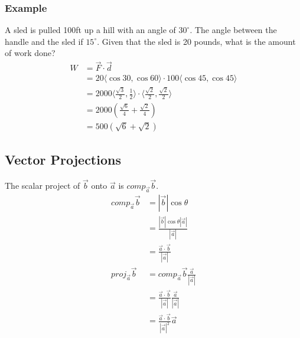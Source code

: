 \documentclass{math}
\begin{document}
\subsubsection*{Example}
A sled is pulled 100ft up a hill with an angle of \( 30^{\circ} \). The angle
between the handle and the sled if \( 15^{\circ} \). Given that the sled is 20
pounds, what is the amount of work done?
\begin{align*}
  W &= \vec{F}\cdot\vec{d} \\
  &= 20\langle\cos30,\cos60\rangle\cdot100\langle\cos45,\cos45\rangle \\
  &= 2000\langle\frac{\sqrt{3}}{2},\frac{1}{2}\rangle
    \cdot\langle\frac{\sqrt{2}}{2},\frac{\sqrt{2}}{2}\rangle \\
  &= 2000(\frac{\sqrt{6}}{4}+\frac{\sqrt{2}}{4}) \\
  &= 500(\sqrt{6}+\sqrt{2})
\end{align*}

\subsection*{Vector Projections}
\begin{center}
\end{center}
The scalar project of \( \vec{b} \) onto \( \vec{a} \) is
\( comp_{\vec{a}}\vec{b} \).
\begin{align*}
  comp_{\vec{a}}\vec{b} &= |\vec{b}|\cos\theta \\
  &= \frac{|\vec{b}|\cos\theta|\vec{a}|}{|\vec{a}|} \\
  &= \frac{\vec{a}\cdot\vec{b}}{|\vec{a}|} \\
  proj_{\vec{a}}\vec{b} &= comp_{\vec{a}}\vec{b}\frac{\vec{a}}{|\vec{a}|} \\
  &= \frac{\vec{a}\cdot\vec{b}}{|\vec{a}|}\frac{\vec{a}}{|\vec{a}|} \\
  &= \frac{\vec{a}\cdot\vec{b}}{|\vec{a}|^{2}}\vec{a}
\end{align*}
\end{document}
